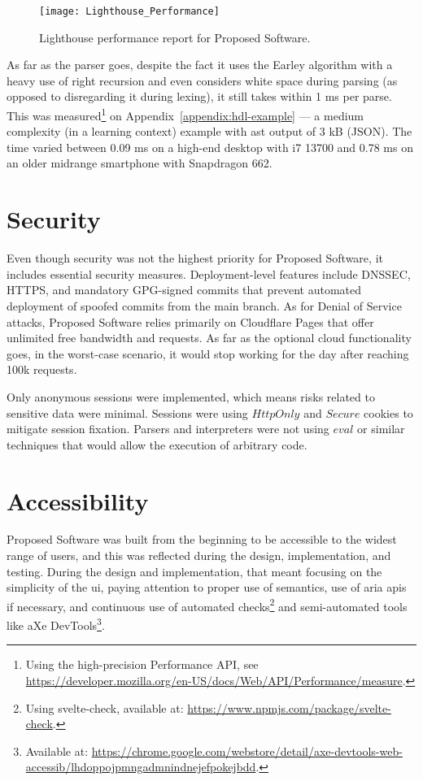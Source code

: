\begin{figure}[H]
    \centering
    \texttt{[image: Lighthouse\_Performance]}
    \caption{Lighthouse performance report for Proposed Software.}
    \label{fig:design-lighthouse-performance}
\end{figure}

As far as the parser goes, despite the fact it uses the Earley algorithm with a heavy use of right recursion and even considers white space during parsing (as opposed to disregarding it during lexing), it still takes within 1 ms per parse.
This was measured\footnote{Using the high-precision Performance API, see \url{https://developer.mozilla.org/en-US/docs/Web/API/Performance/measure}.} on Appendix~\ref{appendix:hdl-example} --- a medium complexity (in a learning context) example with \gls{ast} output of 3 kB (JSON).
The time varied between 0.09 ms on a high-end desktop with i7 13700 and 0.78 ms on an older midrange smartphone with Snapdragon 662.

\section{Security}

Even though security was not the highest priority for Proposed Software, it includes essential security measures.
Deployment-level features include DNSSEC, HTTPS, and mandatory GPG-signed commits that prevent automated deployment of spoofed commits from the main branch.
As for Denial of Service attacks, Proposed Software relies primarily on Cloudflare Pages that offer unlimited free bandwidth and requests.
As far as the optional cloud functionality goes, in the worst-case scenario, it would stop working for the day after reaching 100k requests.

Only anonymous sessions were implemented, which means risks related to sensitive data were minimal.
Sessions were using $HttpOnly$ and $Secure$ cookies to mitigate session fixation.
Parsers and interpreters were not using $eval$ or similar techniques that would allow the execution of arbitrary code.

\section{Accessibility}

Proposed Software was built from the beginning to be accessible to the widest range of users, and this was reflected during the design, implementation, and testing.
During the design and implementation, that meant focusing on the simplicity of the \gls{ui}, paying attention to proper use of semantics, use of \gls{aria} \glspl{api} if necessary, and continuous use of automated checks\footnote{Using svelte-check, available at: \url{https://www.npmjs.com/package/svelte-check}.} and semi-automated tools like aXe DevTools\footnote{Available at: \url{https://chrome.google.com/webstore/detail/axe-devtools-web-accessib/lhdoppojpmngadmnindnejefpokejbdd}.}.

